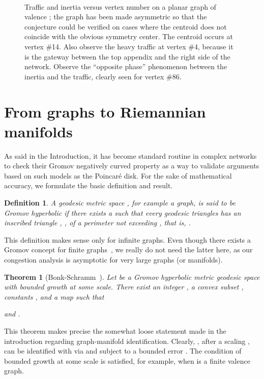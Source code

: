 \documentclass{article}
\newtheorem{theorem}{Theorem}
\newtheorem{definition}{Definition}
\begin{document}
\begin{figure}[t]
\centering
\mbox{
}
\caption{Traffic and inertia versus vertex number on a planar graph of valence ;    
the graph has been made asymmetric so that the conjecture could be verified 
on cases where the centroid does not coincide with the obvious symmetry center. 
The centroid occurs at vertex \#14. Also observe the heavy traffic at vertex \#4, 
because it is the gateway between the top appendix and the right side of the network.  
Observe the ``opposite phase'' phenomenon between the inertia and the traffic, 
clearly seen for vertex \#86.}
\label{f:asymmetric_congestion_issues}
\end{figure}


\section{From graphs to Riemannian manifolds}
\label{s:graphs_to_manifolds}

As said in the Introduction, it has become standard routine in complex networks to check their Gromov 
negatively curved property as a way to validate arguments based on such models as the Poincar\'e disk. 
For the sake of mathematical accuracy, we formulate the basic definition and result.

\begin{definition}
A geodesic metric space , for example a graph, 
is said to be Gromov hyperbolic if there exists a  
such that every geodesic triangles  has an inscribed triangle , 
, of a perimeter not exceeding , that is, 
.  
\end{definition} 
This definition makes sense only for infinite graphs. 
Even though there exists a Gromov concept for finite graphs~\cite{scaled_gromov}, we really do not need the latter here, 
as our congestion analysis is asymptotic for very large graphs (or manifolds). 

\begin{theorem}[Bonk-Schramm~\cite{bonk_schramm}]
Let  be a Gromov hyperbolic metric geodesic space with bounded growth at some scale. 
There exist an integer , 
a convex subset , constants , and a map  
such that 

and . 
\end{theorem}
This theorem makes precise the somewhat loose statement made in the introduction regarding graph-manifold identification. 
Clearly, , after a scaling , can be identified with  via  and subject to a bounded error . 
The condition of bounded growth at some scale is satisfied, for example, when  is a finite valence graph. 
\end{document}
